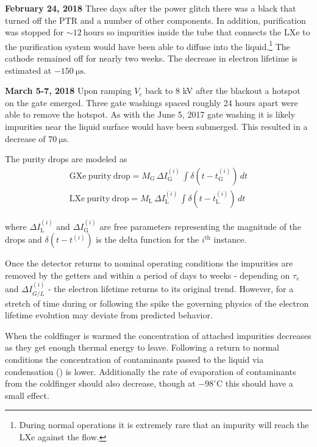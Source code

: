 \textbf{February 24, 2018}  Three days after the power glitch there was a black that turned off the PTR and a number of other
components.  In addition, purification was stopped for ${\sim}12\ \mathrm{hours}$ so impurities inside the tube that connects the LXe to the
purification system would have been able to diffuse into the liquid.\footnote{During normal operations it is extremely rare that an
impurity will reach the LXe against the flow.}  The cathode remained off for nearly two weeks.  The decrease in electron lifetime is
estimated at $-150\ \mathrm{\mu s}$.

\textbf{March 5-7, 2018}  Upon ramping $V_c$ back to 8 kV after the blackout a hotspot on the gate emerged.  Three gate washings spaced
roughly 24 hours apart were able to remove the hotspot.  As with the June 5, 2017 gate washing it is likely impurities near the liquid
surface would have been submerged.  This resulted in a decrease of $70\ \mathrm{\mu s}$.

The purity drops are modeled as
\vspace{-10pt}
\begin{subequations}
\begin{align}
\mathrm{GXe\ purity\ drop} = M_{\mathrm{G}}\, \Delta I_{\mathrm{G}}^{(i)}\, \int \delta (t - t_{\mathrm{G}}^{(i)})\, dt
\\
\mathrm{LXe\ purity\ drop} = M_{\mathrm{L}}\, \Delta I_{\mathrm{L}}^{(i)}\, \int \delta (t - t_{\mathrm{L}}^{(i)})\, dt
\end{align}
\end{subequations}

\vspace{-10pt}

\noindent where $\Delta I_{\mathrm{L}}^{(i)}$ and $\Delta I_{\mathrm{G}}^{(i)}$ are free parameters representing the magnitude of the
drops and $\delta (t - t^{(i)})$ is the delta function for the $i^{\mathrm{th}}$ instance.

Once the detector returns to nominal operating conditions the impurities are removed by the getters and within a period of days to
weeks - depending on $\tau_e$ and $\Delta I_{G/L}^{(i)}$ - the electron lifetime returns to its original trend.  However, for a stretch of
time during or following the spike the governing physics of the electron lifetime evolution may deviate from predicted behavior.

When the coldfinger is warmed the concentration of attached impurities decreases as they get enough thermal energy to leave.  Following
a return to normal conditions the concentration of contaminants passed to the liquid via condensation
() is lower.  Additionally the rate of evaporation of contaminants from
the coldfinger should also decrease, though at $-98^{\circ} \mathrm{C}$ this should have a small effect.

